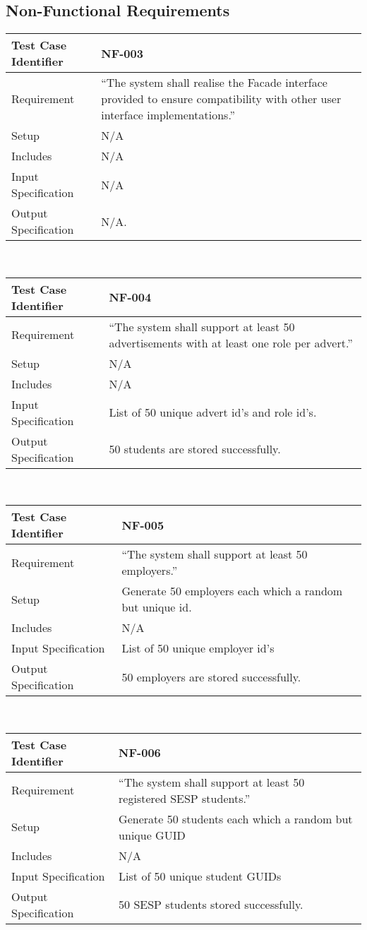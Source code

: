 \documentclass{l3deliverable}
\begin{document}
\subsection{Non-Functional Requirements}

\begin{tabular}{lp{10cm}}
\hline 
\textbf{Test Case Identifier} & NF-003\tabularnewline
\hline 
\hline 
Requirement & ``The system shall realise the Facade interface provided to ensure compatibility with other user interface implementations.'' \tabularnewline
\hline 
Setup & N/A \tabularnewline
\hline 
Includes & N/A \tabularnewline
\hline 
Input Specification &  N/A \tabularnewline
\hline 
Output Specification & N/A. \tabularnewline
\hline 
\end{tabular}\\


\begin{tabular}{lp{10cm}}
\hline 
\textbf{Test Case Identifier} & NF-004\tabularnewline
\hline 
\hline 
Requirement & ``The system shall support at least 50 advertisements with at least one role per advert.'' \tabularnewline
\hline 
Setup & N/A \tabularnewline
\hline 
Includes & N/A \tabularnewline
\hline 
Input Specification & List of 50 unique advert id's and role id's. \tabularnewline
\hline 
Output Specification & 50 students are stored successfully. \tabularnewline
\hline 
\end{tabular}\\

\begin{tabular}{lp{10cm}}
\hline 
\textbf{Test Case Identifier} & NF-005\tabularnewline
\hline 
\hline 
Requirement & ``The system shall support at least 50 employers.'' \tabularnewline
\hline 
Setup & Generate 50 employers each which a random but unique id. \tabularnewline
\hline 
Includes & N/A \tabularnewline
\hline 
Input Specification &  List of 50 unique employer id's\tabularnewline
\hline 
Output Specification & 50 employers are stored successfully. \tabularnewline
\hline 
\end{tabular}\\

\begin{tabular}{lp{10cm}}
\hline 
\textbf{Test Case Identifier} & NF-006\tabularnewline
\hline 
\hline 
Requirement & ``The system shall support at least 50 registered SESP students.'' \tabularnewline
\hline 
Setup & Generate 50 students each which a random but unique GUID \tabularnewline
\hline 
Includes & N/A \tabularnewline
\hline 
Input Specification &  List of 50 unique student GUIDs \tabularnewline
\hline 
Output Specification & 50 SESP students stored successfully. \tabularnewline
\hline 
\end{tabular}\\
\end{document}
